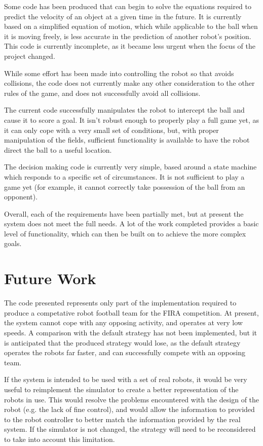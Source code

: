 \documentclass[10pt]{article}
\begin{document}
Some code has been produced that can begin to solve the equations required to
predict the velocity of an object at a given time in the future.  It is
currently based on a simplified equation of motion, which while applicable to
the ball when it is moving freely, is less accurate in the prediction of another
robot's position.  This code is currently incomplete, as it became less urgent
when the focus of the project changed.

While some effort has been made into controlling the robot so that avoids
collisions, the code does not currently make any other consideration to the
other rules of the game, and does not successfully avoid all collisions.

The current code successfully manipulates the robot to intercept the ball and
cause it to score a goal.  It isn't robust enough to properly play a full game
yet, as it can only cope with a very small set of conditions, but, with proper
manipulation of the fields, sufficient functionality is available to have the
robot direct the ball to a useful location.

The decision making code is currently very simple, based around a state machine
which responds to a specific set of circumstances.  It is not sufficient to play
a game yet (for example, it cannot correctly take possession of the ball from
an opponent).

Overall, each of the requirements have been partially met, but at present the
system does not meet the full needs.  A lot of the work completed provides a
basic level of functionality, which can then be built on to achieve the more
complex goals.

\section{Future Work}

The code presented represents only part of the implementation required to
produce a competative robot football team for the FIRA competition.  At
present, the system cannot cope with any opposing activity, and operates at very
low speeds.  A comparison with the default strategy has not been implemented,
but it is anticipated that the produced strategy would lose, as the default
strategy operates the robots far faster, and can successfully compete with an
opposing team.

If the system is intended to be used with a set of real robots, it would be very
useful to reimplement the simulator to create a better representation of the
robots in use.  This would resolve the problems encountered with the design of
the robot (e.g. the lack of fine control), and would allow the information to
provided to the robot controller to better match the information provided by the
real system.  If the simulator is not changed, the strategy will need to be
reconsidered to take into account this limitation.
\end{document}
